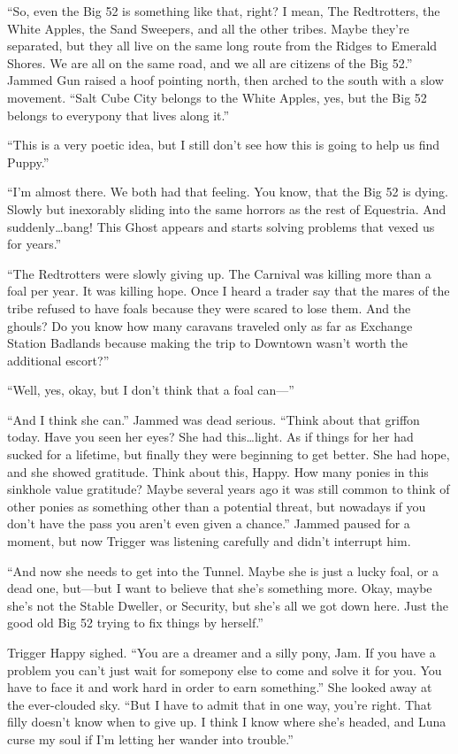 ``So, even the Big 52 is something like that, right? I mean, The Redtrotters, the White Apples, the Sand Sweepers, and all the other tribes. Maybe they're separated, but they all live on the same long route from the Ridges to Emerald Shores. We are all on the same road, and we all are citizens of the Big 52.'' Jammed Gun raised a hoof pointing north, then arched to the south with a slow movement. ``Salt Cube City belongs to the White Apples, yes, but the Big 52 belongs to everypony that lives along it.''

``This is a very poetic idea, but I still don't see how this is going to help us find Puppy.''

``I'm almost there. We both had that feeling. You know, that the Big 52 is dying. Slowly but inexorably sliding into the same horrors as the rest of Equestria. And suddenly\dots bang! This Ghost appears and starts solving problems that vexed us for years.''

``The Redtrotters were slowly giving up. The Carnival was killing more than a foal per year. It was killing hope. Once I heard a trader say that the mares of the tribe refused to have foals because they were scared to lose them. And the ghouls? Do you know how many caravans traveled only as far as Exchange Station Badlands because making the trip to Downtown wasn't worth the additional escort?''

``Well, yes, okay, but I don't think that a foal can---'' 

``And I think she can.'' Jammed was dead serious. ``Think about that griffon today. Have you seen her eyes? She had this\dots light. As if things for her had sucked for a lifetime, but finally they were beginning to get better. She had hope, and she showed gratitude. Think about this, Happy. How many ponies in this sinkhole value gratitude? Maybe several years ago it was still common to think of other ponies as something other than a potential threat, but nowadays if you don't have the pass you aren't even given a chance.'' Jammed paused for a moment, but now Trigger was listening carefully and didn't interrupt him.

``And now she needs to get into the Tunnel. Maybe she is just a lucky foal, or a dead one, but---but I want to believe that she's something more. Okay, maybe she's not the Stable Dweller, or Security, but she's all we got down here. Just the good old Big 52 trying to fix things by herself.''

Trigger Happy sighed. ``You are a dreamer and a silly pony, Jam. If you have a problem you can't just wait for somepony else to come and solve it for you. You have to face it and work hard in order to earn something.'' She looked away at the ever-clouded sky. ``But I have to admit that in one way, you're right. That filly doesn't know when to give up. I think I know where she's headed, and Luna curse my soul if I'm letting her wander into trouble.''


